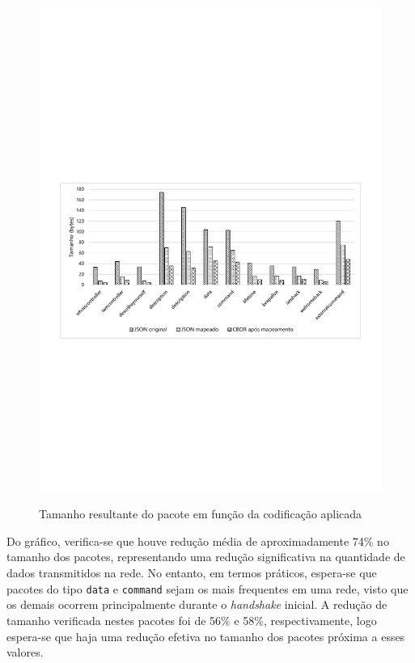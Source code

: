 \begin{figure}[h]
	\centering
	\caption{Tamanho resultante do pacote em função da codificação aplicada}
	\includegraphics[width=\textwidth]{imagens/tamanho_pacote.pdf}
 	\label{fig:tamanho_pacote}
\end{figure}

Do gráfico, verifica-se que houve redução média de aproximadamente 74\% no tamanho dos pacotes, representando uma redução significativa na quantidade de dados transmitidos na rede. No entanto, em termos práticos, espera-se que pacotes do tipo \texttt{data} e \texttt{command} sejam os mais frequentes em uma rede, visto que os demais ocorrem principalmente durante o \textit{handshake} inicial. A redução de tamanho verificada nestes pacotes foi de 56\% e 58\%, respectivamente, logo espera-se que haja uma redução efetiva no tamanho dos pacotes próxima a esses valores. 

